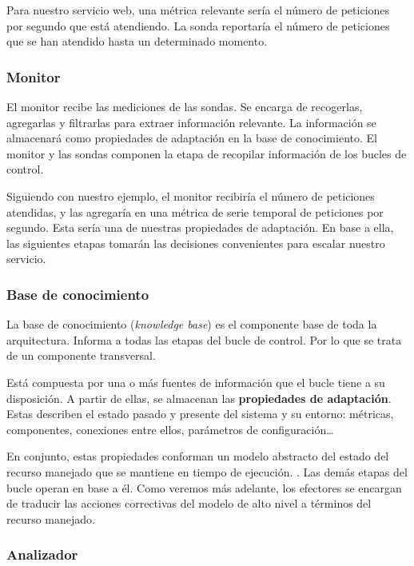 Para nuestro servicio web, una métrica relevante sería el número de peticiones por segundo que está atendiendo. La sonda reportaría el número de peticiones que se han atendido hasta un determinado momento.

\subsubsection{Monitor}

El monitor recibe las mediciones de las sondas. Se encarga de recogerlas, agregarlas y filtrarlas para extraer información relevante. La información se almacenará como propiedades de adaptación en la base de conocimiento.\cite{fonsEspecificacionSistemasAutoadaptativos2021} El monitor y las sondas componen la etapa de recopilar información de los bucles de control.

Siguiendo con nuestro ejemplo, el monitor recibiría el número de peticiones atendidas, y las agregaría en una métrica de serie temporal de peticiones por segundo. Esta sería una de nuestras propiedades de adaptación. En base a ella, las siguientes etapas tomarán las decisiones convenientes para escalar nuestro servicio.

\subsubsection{Base de conocimiento}

La base de conocimiento (\emph{knowledge base}) es el componente base de toda la arquitectura. Informa a todas las etapas del bucle de control. Por lo que se trata de un componente transversal.

Está compuesta por una o más fuentes de información que el bucle tiene a su disposición. A partir de ellas, se almacenan las \textbf{propiedades de adaptación}. Estas describen el estado pasado y presente del sistema y su entorno: métricas, componentes, conexiones entre ellos, parámetros de configuración\dots

En conjunto, estas propiedades conforman un modelo abstracto del estado del recurso manejado que se mantiene en tiempo de ejecución. \cite{garlanIncreasingSystemDependability2003}. Las demás etapas del bucle operan en base a él. Como veremos más adelante, los efectores se encargan de traducir las acciones correctivas del modelo de alto nivel a términos del recurso manejado.

\subsubsection{Analizador}

